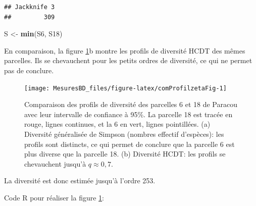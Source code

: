 \documentclass[
  11pt,
  french,
  a4paper,
  extrafontsizes,onecolumn,openright
  ]{memoir}
\newenvironment{Shaded}{\begin{snugshade}}{\end{snugshade}}
\newcommand{\AttributeTok}[1]{\textcolor[rgb]{0.13,0.29,0.53}{#1}}
\newcommand{\DecValTok}[1]{\textcolor[rgb]{0.00,0.00,0.81}{#1}}
\newcommand{\FunctionTok}[1]{\textcolor[rgb]{0.13,0.29,0.53}{\textbf{#1}}}
\newcommand{\NormalTok}[1]{#1}
\newcommand{\OtherTok}[1]{\textcolor[rgb]{0.56,0.35,0.01}{#1}}
\newcommand{\SpecialCharTok}[1]{\textcolor[rgb]{0.81,0.36,0.00}{\textbf{#1}}}
\newcommand{\StringTok}[1]{\textcolor[rgb]{0.31,0.60,0.02}{#1}}
\begin{document}
\begin{Shaded}
\end{Shaded}

\begin{verbatim}
## Jackknife 3 
##         309
\end{verbatim}

\begin{Shaded}
\begin{Highlighting}[]
\NormalTok{S }\OtherTok{\textless{}{-}} \FunctionTok{min}\NormalTok{(S6, S18)}
\end{Highlighting}
\end{Shaded}

\normalsize

En comparaison, la figure \ref{fig:comProfilzetaFig}b montre les profils de diversité HCDT des mêmes parcelles.
Ils se chevauchent pour les petits ordres de diversité, ce qui ne permet pas de conclure.



\scriptsize

\begin{figure}

{\centering \texttt{[image: MesuresBD\_files/figure-latex/comProfilzetaFig-1]} 

}

\caption{Comparaison des profils de diversité des parcelles 6 et 18 de Paracou avec leur intervalle de confiance à 95\%. La parcelle 18 est tracée en rouge, lignes continues, et la 6 en vert, lignes pointillées. (a) Diversité généralisée de Simpson (nombres effectif d'espèces): les profils sont distincts, ce qui permet de conclure que la parcelle 6 est plus diverse que la parcelle 18. (b) Diversité HCDT: les profils se chevauchent jusqu'à \(q \approx 0,7\).}\label{fig:comProfilzetaFig}
\end{figure}

\normalsize

La diversité est donc estimée jusqu'à l'ordre 253.

Code R pour réaliser la figure \ref{fig:comProfilzetaFig}:
\end{document}
